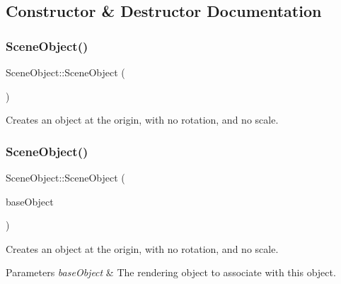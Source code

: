 \subsection{Constructor \& Destructor Documentation}
\hypertarget{class_scene_object_a0d268d96d77dbeb45b07a6442e2f4d0d}{}\label{class_scene_object_a0d268d96d77dbeb45b07a6442e2f4d0d} 
\subsubsection{\texorpdfstring{Scene\+Object()}{SceneObject()}\hspace{0.1cm}{\footnotesize\ttfamily [1/3]}}
{\footnotesize\ttfamily Scene\+Object\+::\+Scene\+Object (\begin{DoxyParamCaption}{ }\end{DoxyParamCaption})}



Creates an object at the origin, with no rotation, and no scale. 

\hypertarget{class_scene_object_a9dd76f946c8e0743bed57f9499773fbd}{}\label{class_scene_object_a9dd76f946c8e0743bed57f9499773fbd} 
\subsubsection{\texorpdfstring{Scene\+Object()}{SceneObject()}\hspace{0.1cm}{\footnotesize\ttfamily [2/3]}}
{\footnotesize\ttfamily Scene\+Object\+::\+Scene\+Object (\begin{DoxyParamCaption}\item[{std\+::shared\+\_\+ptr$<$ class \hyperlink{class_rendering_object}{Rendering\+Object} $>$}]{base\+Object }\end{DoxyParamCaption})}



Creates an object at the origin, with no rotation, and no scale. 


\begin{DoxyParams}{Parameters}
{\em base\+Object} & The rendering object to associate with this object. \\
\hline
\end{DoxyParams}
\hypertarget{class_scene_object_aa89b21b4732296d196a76d1785aee02c}{}\label{class_scene_object_aa89b21b4732296d196a76d1785aee02c} 
